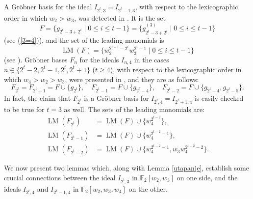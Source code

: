 \documentclass{amsart}
\theoremstyle{definition}
\theoremstyle{remark}
\numberwithin{equation}{section}
\newcommand{\F}{\mathbb F}
\newcommand{\lm}{\operatorname{LM}}
\renewcommand{\le}{\leqslant}
\renewcommand{\ge}{\geqslant}
\begin{document}
A Gr\"obner basis for the ideal $I_{2^t,3}=I_{2^t-1,3}$, with respect to the lexicographic order in which $w_2>w_3$, was detected in \cite{Fukaya}. It is the set
\[F=\big\{g_{2^t-3+2^i}\mid 0\le i\le t-1\big\}=\big\{g_{2^t-3+2^i}^{(3)}\mid 0\le i\le t-1\big\}\]
(see (\ref{3=4})), and the set of the leading monomials is
\begin{equation}\label{LM(F)}
   \lm(F)=\big\{w_2^{2^{t-1}-2^i}w_3^{2^i-1}\mid 0\le i\le t-1\big\}
\end{equation}
(see \cite[Proposition 3.4]{CP}).
Gr\"obner bases $F_n$ for the ideals $I_{n,4}$ in the cases $n\in\{2^t-2,2^t-1,2^t,2^t+1\}$ ($t\ge4$), with respect to the lexicographic order in which $w_4>w_2>w_3$, were presented in \cite[Lemma 3.4]{Rusin}, and they are as follows:
\[F_{2^t}=F_{2^t+1}= F \cup \{g_{2^t } \}, \quad F_{2^t-1}=F \cup  \{g_{2^t -4} \}, \quad F_{2^t-2}=F \cup  \{g_{2^t -4}, g_{2^t -5} \}.\]
In fact, the claim that $F_{2^t}$ is a Gr\"obner basis for $I_{2^t,4}=I_{2^t+1,4}$ is easily checked to be true for $t=3$ as well. The sets of the leading monomials are:
\begin{align*}
    \lm(F_{2^t})&=\lm(F)\cup\big\{w_4^{2^{t-2}}\big\},\\
    \lm(F_{2^t-1})&=\lm(F)\cup\big\{w_4^{2^{t-2}-1}\big\},\\
    \lm(F_{2^t-2})&=\lm(F)\cup\big\{w_4^{2^{t-2}-1},w_3w_4^{2^{t-2}-2}\big\}.
\end{align*}

We now present two lemmas which, along with Lemma \ref{utapanje}, establish some crucial connections between the ideal $I_{2^t,3}$ in $\F_2[w_2,w_3]$ on one side, and the ideals $I_{2^t,4}$ and $I_{2^t-1,4}$ in $\F_2[w_2,w_3,w_4]$ on the other.
\end{document}
